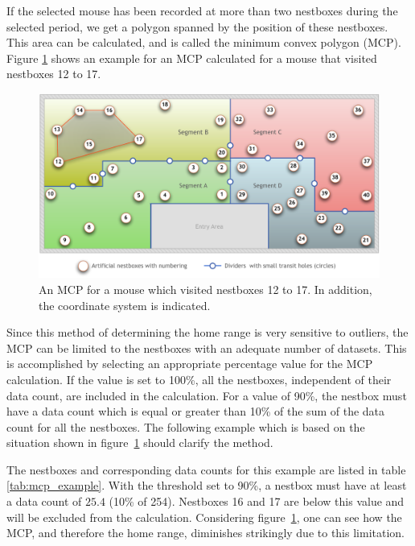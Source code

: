 If the selected mouse has been recorded at more than two nestboxes during the selected period, we get a polygon spanned by the position of these nestboxes. This area can be calculated, and is called the minimum convex polygon (MCP). Figure \ref{fig:mcp} shows an example for an MCP calculated for a mouse that visited nestboxes 12 to 17. 

\begin{figure}[htpb]
\begin{center}
  \includegraphics[width=.75\textwidth]{assets/pdf/mcp.pdf}
  \caption[Minimum convex polygon (MCP)]{An MCP for a mouse which visited nestboxes 12 to 17. In addition, the coordinate system is indicated.}
  \label{fig:mcp}
\end{center}
\end{figure}

Since this method of determining the home range is very sensitive to outliers, the MCP can be limited to the nestboxes with an adequate number of datasets. This is accomplished by selecting an appropriate percentage value for the MCP calculation. If the value is set to 100\%, all the nestboxes, independent of their data count, are included in the calculation. For a value of 90\%, the nestbox must have a data count which is equal or greater than 10\% of the sum of the data count for all the nestboxes. The following example which is based on the situation shown in figure~\ref{fig:mcp} should clarify the method.



The nestboxes and corresponding data counts for this example are listed in table \ref{tab:mcp_example}. With the threshold set to 90\%, a nestbox must have at least a data count of $25.4$ (10\% of 254). Nestboxes 16 and 17 are below this value and will be excluded from the calculation. Considering figure~\ref{fig:mcp}, one can see how the MCP, and therefore the home range, diminishes strikingly due to this limitation.


